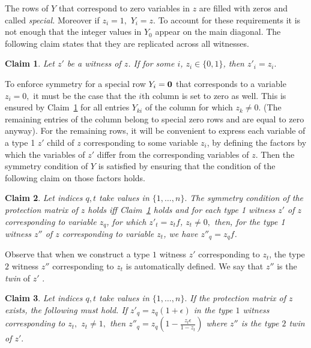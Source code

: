 \documentclass[11pt]{article}\usepackage{amsmath}
\newtheorem{claim}{Claim}[section]
\begin{document}
The rows of $Y$ that correspond to zero variables in $z$ are filled 
with zeros and called {\em
  special.}  
Moreover if $z_i=1,$ $Y_i= z.$ 
To account for these requirements it is not enough that the integer values
in $Y_0$ appear on the main diagonal. The following claim states that
they are replicated across  all witnesses. 

\begin{claim}\label{simplefact1}
Let  $z'$ be a witness  of  $z$.  If  for some $i$, $z_i\in
\{0,1\}$, then $z'_i=z_i.$
\end{claim}


To enforce symmetry  for a special row $Y_i={\bf  0}$ that corresponds
to a  variable $z_i=0,$ it must be  the case that the  $i$th column is
set to  zero as well.  This is ensured by  Claim~\ref{simplefact1} for
all  entries $Y_{ki}$  of  the column  for  which $z_k  \neq 0.$  (The
remaining entries  of the column belong  to special zero  rows and are
equal to zero anyway). 
For  the remaining rows, it will be convenient to 
  express  each variable of a type 1 $z'$  child of $z$ corresponding
to some variable  $z_i$, by defining the factors by which  the variables of $z'$
differ from the  corresponding variables of $z$. Then  the symmetry condition of
$Y$ is satisfied by ensuring that  the condition of the following claim on those
factors holds. 


\begin{claim}\label{simplefact2}
Let indices $q, t$ take values in $\{1,\ldots,n\}.$ The symmetry condition of the
protection  matrix  of  $z$  holds  iff  Claim~\ref{simplefact1} holds
 and for  each type  1  witness   $z'$  of  $z$
corresponding to variable $z_q$, for which 
$z'_t=z_tf$, $z_t \neq 0,$ 
then, for  the type 1 witness  $z''$ of  $z$ corresponding to variable
$z_t$, we have $z''_q=z_qf$.
\end{claim}



Observe that  when we construct a  type $1$ witness $z'$  corresponding to $z_t$,
 the type  $2$ witness  $z''$ corresponding  to $z_t$ is  automatically defined. We
 say that $z''$ is the \emph{twin} of $z'$ .
 
\begin{claim}\label{simplefact3}
Let indices $q, t$ take values in $\{1,\ldots,n\}.$ If the protection matrix of $z$
exists, 
the following must hold. 
If $z'_q=z_q(1+\epsilon)$ in the type $1$ witness  corresponding to
$z_t,$ $z_t \neq 1,$ then
$z''_q=z_q(1-\frac{z_t\epsilon}{1-z_t})$ where $z''$ is the  type $2$ twin of $z'.$
\end{claim}
\end{document}
